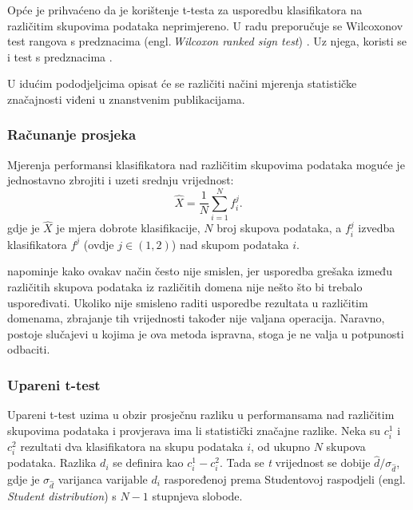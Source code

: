 Opće je prihvaćeno da je korištenje t-testa za usporedbu klasifikatora na različitim skupovima podataka neprimjereno. U radu \citep{demvsar2006statistical} preporučuje se Wilcoxonov test rangova s predznacima (engl.\,\textit{Wilcoxon ranked sign test}) \citep{wilcoxon1945individual}. Uz njega, koristi se i test s predznacima \cite{dixon1946statistical}. 

U idućim pododjeljcima opisat će se različiti načini mjerenja statističke značajnosti viđeni u znanstvenim publikacijama.

\subsubsection{Računanje prosjeka}

Mjerenja performansi klasifikatora nad različitim skupovima podataka moguće je jednostavno zbrojiti i uzeti srednju vrijednost:
\begin{equation}
\hat{X} = \frac{1}{N} \sum^{N}_{i = 1} f_{i}^{j}. 
\end{equation}
gdje je $\hat{X}$ je mjera dobrote klasifikacije, $N$ broj skupova podataka, a $f_{i}^{j}$ izvedba klasifikatora $f^j$ (ovdje $j\in (1,2)$) nad skupom podataka $i$.

\citep{webb2000multiboosting} napominje kako ovakav način često nije smislen, jer usporedba grešaka između različitih skupova podataka iz različitih domena nije nešto što bi trebalo uspoređivati. Ukoliko nije smisleno raditi usporedbe rezultata u različitim domenama, zbrajanje tih vrijednosti također nije valjana operacija. Naravno, postoje slučajevi u kojima je ova metoda ispravna, stoga je ne valja u potpunosti odbaciti.

\subsubsection{Upareni t-test}

Upareni t-test \citep{sprinthall1990basic} uzima u obzir prosječnu razliku u performansama nad različitim skupovima podataka i provjerava ima li statistički značajne razlike. Neka su $c^{1}_{i}$ i $c^{2}_{i}$ rezultati dva klasifikatora na skupu podataka $i$, od ukupno $N$ skupova podataka. Razlika $d_i$ se definira kao $c^{1}_{i} - c^{2}_{i}$. Tada se \textit{t} vrijednost se dobije $\hat{d}/\sigma_{\hat{d}}$, gdje je $\sigma_ {\hat{d}}$ varijanca varijable $d_i$ raspoređenoj prema Studentovoj raspodjeli (engl.\,\textit{Student distribution}) s $N-1$ stupnjeva slobode. 

